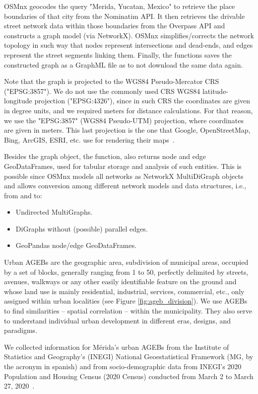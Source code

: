 OSMnx geocodes the query "Merida, Yucatan, Mexico" to retrieve the place boundaries of that city from the Nominatim API. It then retrieves the drivable street network data within those boundaries from the Overpass API and constructs a graph model (via NetworkX). OSMnx simplifies/corrects the network topology in such way that nodes represent intersections and dead-ends, and edges represent the street segments linking them. Finally, the functions saves the constructed graph as a GraphML file as to not download the same data again.

Note that the graph is projected to the WGS84 Pseudo-Mercator CRS ("EPSG:3857"). We do not use the commonly used CRS WGS84 latitude-longitude projection ("EPSG:4326"), since in such CRS the coordinates are given in degree units, and we required meters for distance calculations. For that reason, we use the "EPSG:3857" (WGS84 Pseudo-UTM) projection, where coordinates are given in meters. This last projection is the one that Google, OpenStreetMap, Bing, ArcGIS, ESRI, etc. use for rendering their maps~\cite{epsg3857}.

Besides the graph object, the function, also returns node and edge GeoDataFrames, used for tabular storage and analysis of such entities. This is possible since OSMnx models all networks as NetworkX MultiDiGraph objects and allows conversion among different network models and data structures, i.e., from and to:

\begin{itemize}
 \item Undirected MultiGraphs.
 \item DiGraphs without (possible) parallel edges.
 \item GeoPandas node/edge GeoDataFrames.
\end{itemize}

Urban AGEBs are the geographic area, subdivision of municipal areas, occupied by a set of blocks, generally ranging from 1 to 50, perfectly delimited by streets, avenues, walkways or any other easily identifiable feature on the ground and whose land use is mainly residential, industrial, services, commercial, etc., only assigned within urban localities (see Figure \ref{fig:ageb_division}). We use AGEBs to find similarities -- spatial correlation -- within the municipality. They also serve to understand individual urban development in different eras, designs, and paradigms.

We collected information for Mérida's urban AGEBs from the Institute of Statistics and Geography's (INEGI) National Geoestatistical Framework (MG, by the acronym in spanish) and from socio-demographic data from INEGI's 2020 Population and Housing Census (2020 Census) conducted from March 2 to March 27, 2020~\cite{2020census}.

